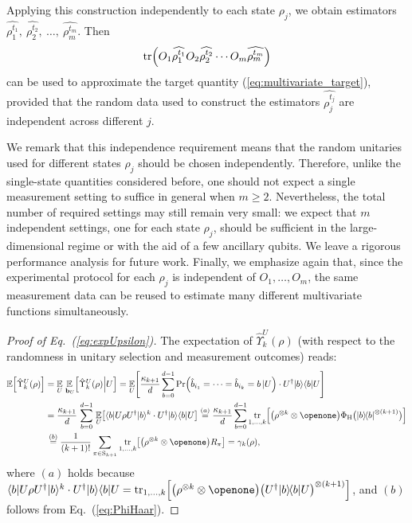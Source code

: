 \documentclass[aps,prl,twocolumn,nofootinbib,superscriptaddress,10pt]{revtex4-2}
\let\originalleft\left
\let\originalright\right
\renewcommand{\left}{\mathopen{}\mathclose\bgroup\originalleft}
\renewcommand{\right}{\aftergroup\egroup\originalright}
\def\E{ {\mathbb E} } %
\def\>{\rangle}
\def\<{\langle}
\newcommand{\ketbra}[2]{\ensuremath{\left|#1\right\rangle\!\left\langle#2\right|}}
\DeclareMathOperator{\Tr}{tr}
\theoremstyle{plain}
\theoremstyle{definition}
\def\eqref#1{\textup{(\ref{#1})}}
\newcommand{\eref}[1]{Eq.~\textup{(\ref{#1})}}
\begin{document}
Applying this construction independently to each state $\rho_j$, we obtain estimators
$\widehat{\rho_1^{t_1}},\ \widehat{\rho_2^{t_2}},\ \dots,\ \widehat{\rho_m^{t_m}}$.
Then
\begin{align}
\Tr \left(
O_1\widehat{\rho_1^{t_1}}
O_2\widehat{\rho_2^{t_2}}
\cdots
O_m\widehat{\rho_m^{t_m}}
\right)
\end{align}
can be used to approximate the target quantity \eqref{eq:multivariate_target}, provided that the random data used to construct the estimators $\widehat{\rho_j^{t_j}}$ are independent across different $j$.

We remark that this independence requirement means that the random unitaries used for different states $\rho_j$ should be chosen independently. 
Therefore, unlike the single-state quantities considered before, one should not expect a single measurement setting to suffice in general when $m\ge 2$. 
Nevertheless, the total number of required settings may still remain very small: we expect that $m$ independent settings, one for each state $\rho_j$, should be sufficient in the large-dimensional regime or with the aid of a few ancillary qubits.
We leave a rigorous performance analysis for future work. 
Finally, we emphasize again that, since the experimental protocol for each $\rho_j$ is independent of $O_1,\dots,O_m$, the same measurement data can be reused to estimate many different multivariate functions simultaneously.

\begin{proof}[Proof of \eref{eq:expUpsilon}]
The expectation of $\hat{\Upsilon}_k^{U} (\rho)$ (with respect to the randomness in unitary selection and measurement outcomes) reads: 
\begin{align}
\E \left[ \hat{\Upsilon}_k^{U} (\rho) \right] 
&=\underset{U }{\E} \, \underset{\,\mathbf{b}_{U}}{\E} \left[ \hat{\Upsilon}_k^{U}(\rho)  \Big| U \right]
 =\underset{U }{\E} \left[ \frac{\kappa_{k+1}}{d} \sum_{b=0}^{d-1} 
            \Pr\left(\hat{b}_{i_1}=\dots=\hat{b}_{i_k}=b \,|U \right) \cdot U^{\dag}|b\>\<b|U\right] 
\nonumber \\
&=\frac{\kappa_{k+1}}{d}\, \sum_{b=0}^{d-1} \, \underset{U }{\E} \left[ \<b|U\rho U^{\dag}|b\>^k \cdot U^{\dag}|b\>\<b|U \right] 
\stackrel{(a)}{=} 
\frac{\kappa_{k+1}}{d} \sum_{b=0}^{d-1} \Tr_{1,\dots,k} \left[ \left( \rho^{\otimes k}\otimes \openone \right)  
\Phi_{\rm H} \big( \ketbra{b}{b}^{\otimes {(k+1)}} \big) \right]
\nonumber \\
&\,\stackrel{(b)}{=}
\frac{1 }{(k+1)! } \sum_{\pi\in \mathrm{S}_{k+1}}  \Tr_{1,\dots,k}\left[ \left(\rho^{\otimes k} \otimes \openone \right)R_\pi\right]
=\gamma_k(\rho) , 
\end{align}
where $(a)$ holds because $\<b|U\rho U^{\dag}|b\>^k \cdot U^{\dag}|b\>\<b|U =\Tr_{1,\dots,k} \left[ \left( \rho^{\otimes k}\otimes \openone \right) 
\big( U^{\dag}\ketbra{b}{b} U\big)^{\otimes (k+1)}\right]$, and $(b)$ follows from \eref{eq:PhiHaar}.
\end{proof}
\end{document}
